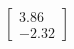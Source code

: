 \documentclass[preview]{standalone}
\begin{document}
\begin{align*}
\begin{bmatrix} 3.86 \\ -2.32 \end{bmatrix}
\end{align*}
\end{document}
